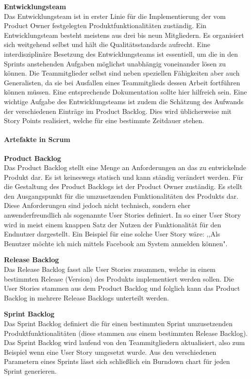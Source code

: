 \newpage

\textbf{Entwicklungsteam}\\
Das Entwicklungsteam ist in erster Linie für die Implementierung der vom Product Owner festgelegten Produktfunktionalitäten zuständig. Ein Entwicklungsteam besteht meistens aus drei bis neun Mitgliedern. Es organisiert sich weitgehend selbst und hält die Qualitätsstandards aufrecht. Eine interdisziplinäre Besetzung des Entwicklungsteams ist essentiell, um die in den Sprints anstehenden Aufgaben möglichst unabhängig voneinander lösen zu können. Die Teammitglieder selbst sind neben speziellen Fähigkeiten aber auch Generalisten, da sie bei Ausfallen eines Teammitglieds dessen Arbeit fortführen können müssen. Eine entsprechende Dokumentation sollte hier hilfreich sein. Eine wichtige Aufgabe des Entwicklungsteams ist zudem die Schätzung des Aufwands der verschiedenen Einträge im Product Backlog. Dies wird üblicherweise mit Story Points realisiert, welche für eine bestimmte Zeitdauer stehen. \cite{SCRUM}

\paragraph{Artefakte in Scrum}
\textbf{Product Backlog}\\
Das Product Backlog stellt eine Menge an Anforderungen an das zu entwickelnde Produkt dar. Es ist keineswegs statisch und kann ständig verändert werden. Für die Gestaltung des Product Backlogs ist der Product Owner zuständig. Es stellt den Ausgangspunkt für die umzusetzenden Funktionalitäten des Produkts dar. Diese Anforderungen sind jedoch nicht technisch, sondern eher anwenderfreundlich als sogenannte User Stories definiert. In so einer User Story wird in meist einem knappen Satz der Nutzen der Funktionalität für den Endnutzer dargestellt. Ein Beispiel für eine solche User Story wäre: ,,Als Benutzer möchte ich mich mittels Facebook am System anmelden können". \cite{SCRUM}

\textbf{Release Backlog}\\
Das Release Backlog fasst alle User Stories zusammen, welche in einem bestimmten Release (Version) des Produkts implementiert werden sollen. Die User Stories stammen aus dem Product Backlog und folglich kann das Product Backlog in mehrere Release Backlogs unterteilt werden. \cite{SCRUM}

\textbf{Sprint Backlog}\\
Das Sprint Backlog definiert die für einen bestimmten Sprint umzusetzenden Produktfunktionalitäten (diese stammen aus einem bestimmten Release Backlog). Das Sprint Backlog wird laufend von den Teammitgliedern aktualisiert, also zum Beispiel wenn eine User Story umgesetzt wurde. Aus den verschiedenen Parametern eines Sprints lässt sich schließlich ein Burndown chart für jeden Sprint generieren. \cite{SCRUM}

